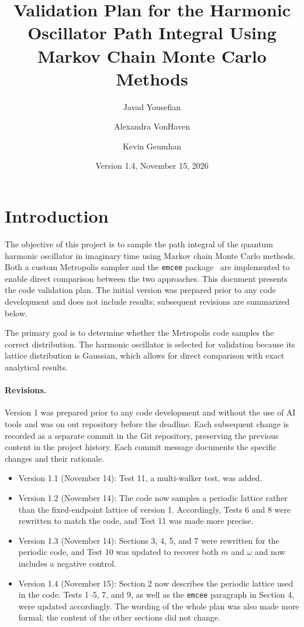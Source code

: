 \documentclass[11pt]{article}
\title{Validation Plan for the Harmonic Oscillator Path Integral Using Markov Chain Monte Carlo Methods}
\author{Javad Yousefian \and Alexandra VonHaven \and Kevin Geumhan}
\date{Version 1.4, November 15, 2026}
\begin{document}
\maketitle

\section{Introduction}
The objective of this project is to sample the path integral of the quantum harmonic oscillator in imaginary time using Markov chain Monte Carlo methods. Both a custom Metropolis sampler and the \texttt{emcee} package~\cite{emcee} are implemented to enable direct comparison between the two approaches. This document presents the code validation plan. The initial version was prepared prior to any code development and does not include results; subsequent revisions are summarized below.

The primary goal is to determine whether the Metropolis code samples the correct distribution. The harmonic oscillator is selected for validation because its lattice distribution is Gaussian, which allows for direct comparison with exact analytical results.

\paragraph{Revisions.} Version 1 was prepared prior to any code development and without the use of AI tools and was on out repository before the deadline. Each subsequent change is recorded as a separate commit in the Git repository, preserving the previous content in the project history. Each commit message documents the specific changes and their rationale.
\begin{itemize}
  \item Version 1.1 (November 14): Test 11, a multi-walker test, was added.
  \item Version 1.2 (November 14): The code now samples a periodic lattice rather than the fixed-endpoint lattice of version 1. Accordingly, Tests 6 and 8 were rewritten to match the code, and Test 11 was made more precise.
  \item Version 1.3 (November 14): Sections 3, 4, 5, and 7 were rewritten for the periodic code, and Test 10 was updated to recover both $m$ and $\omega$ and now includes a negative control.
  \item Version 1.4 (November 15): Section 2 now describes the periodic lattice used in the code. Tests 1--5, 7, and 9, as well as the \texttt{emcee} paragraph in Section 4, were updated accordingly. The wording of the whole plan was also made more formal; the content of the other sections did not change.
\end{itemize}
\end{document}
